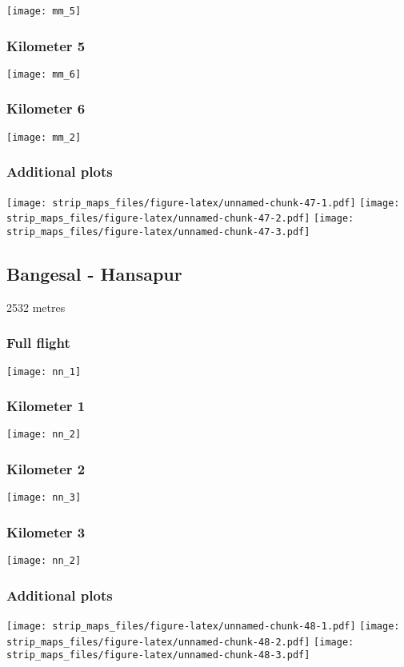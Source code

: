 \documentclass[]{article}
\begin{document}
\texttt{[image: mm\_5]}

\subsubsection{Kilometer 5}\label{kilometer-5-30}

\texttt{[image: mm\_6]}

\subsubsection{Kilometer 6}\label{kilometer-6-25}

\texttt{[image: mm\_2]}

\subsubsection{Additional plots}\label{additional-plots-38}

\texttt{[image: strip\_maps\_files/figure-latex/unnamed-chunk-47-1.pdf]}
\texttt{[image: strip\_maps\_files/figure-latex/unnamed-chunk-47-2.pdf]}
\texttt{[image: strip\_maps\_files/figure-latex/unnamed-chunk-47-3.pdf]}

\newpage

\subsection{Bangesal - Hansapur}\label{bangesal---hansapur}

2532 metres

\subsubsection{Full flight}\label{full-flight-39}

\texttt{[image: nn\_1]}

\subsubsection{Kilometer 1}\label{kilometer-1-39}

\texttt{[image: nn\_2]}

\subsubsection{Kilometer 2}\label{kilometer-2-39}

\texttt{[image: nn\_3]}

\subsubsection{Kilometer 3}\label{kilometer-3-39}

\texttt{[image: nn\_2]}

\subsubsection{Additional plots}\label{additional-plots-39}

\texttt{[image: strip\_maps\_files/figure-latex/unnamed-chunk-48-1.pdf]}
\texttt{[image: strip\_maps\_files/figure-latex/unnamed-chunk-48-2.pdf]}
\texttt{[image: strip\_maps\_files/figure-latex/unnamed-chunk-48-3.pdf]}
\end{document}
